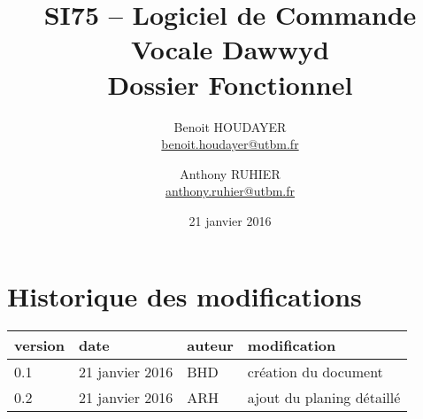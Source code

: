 \documentclass[12pt]{article}
\title{\textbf{SI75 -- Logiciel de Commande Vocale Dawwyd\\[0.5em]Dossier Fonctionnel}}
\author{Benoit HOUDAYER \\ \href{mailto:benoit.houdayer@utbm.fr}{benoit.houdayer@utbm.fr}
\and Anthony RUHIER \\ \href{mailto:anthony.ruhier@utbm.fr}{anthony.ruhier@utbm.fr}}
\date{21 janvier 2016}
\begin{document}
    \maketitle
    \thispagestyle{empty}
    \tableofcontents
    \listoffigures

    \section*{Historique des modifications}

    \begin{table}
    \centering

    \begin{tabular}{|l|l|l|l|}
        \hline
        version & date & auteur & modification \\
        \hline
        0.1 & 21 janvier 2016 & BHD & création du document \\
        0.2 & 21 janvier 2016 & ARH & ajout du planing détaillé \\
        \hline
    \end{tabular}
    \end{table}

    \afterpage{\cfoot{\thepage}}
    \newpage
\end{document}

